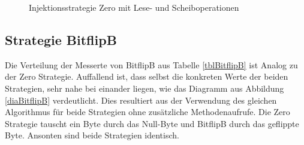 \begin{figure}[!htb]
\label{diaZero}
\caption[Messung Zero Strategie]{Injektionsstrategie Zero mit Lese- und Scheiboperationen}
\end{figure}

\subsection*{Strategie BitflipB}

Die Verteilung der Messerte von BitflipB aus Tabelle \ref{tblBitflipB} ist Analog zu der Zero Strategie. Auffallend ist, dass selbst die konkreten Werte der beiden Strategien, sehr nahe bei einander liegen, wie das Diagramm aus Abbildung \ref{diaBitflipB} verdeutlicht. Dies resultiert aus der Verwendung des gleichen Algorithmus f\"ur beide Strategien ohne zus\"atzliche Methodenaufrufe. Die Zero Strategie tauscht ein Byte durch das Null-Byte und BitflipB durch das geflippte Byte. Ansonten sind beide Strategien identisch.

